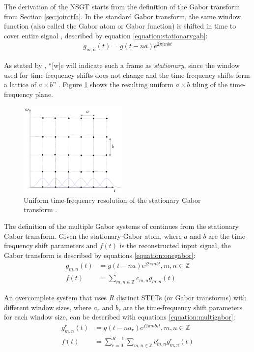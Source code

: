 \documentclass[report.tex]{subfiles}
\begin{document}
The derivation of the NSGT starts from the definition of the Gabor transform from Section \ref{sec:jointtfa}. In the standard Gabor transform, the same window function (also called the Gabor atom or Gabor function) is shifted in time to cover entire signal \parencite{adaptivecqt}, described by equation \eqref{equation:stationarygab}:
\begin{align} \tag{11}\label{equation:stationarygab}
g_{m, n}(t) = g(t - na)e^{2\pi i m b t}
\end{align}

As stated by \citeauthor{adaptivecqt}, ``[w]e will indicate such a frame as \textit{stationary}, since the window used for time-frequency shifts does not change and the time-frequency shifts form a lattice of $a \times b$'' \parencite[3]{adaptivecqt}. Figure \ref{fig:uniformtflattice} shows the resulting uniform $a \times b$ tiling of the time-frequency plane.

\begin{figure}[ht]
	\centering
	\includegraphics[width=0.4688\textwidth]{./images-tftheory/stationarygabor.png}
	\caption{Uniform time-frequency resolution of the stationary Gabor transform \parencite[3]{adaptivecqt}.}
	\label{fig:uniformtflattice}
\end{figure}

The definition of the multiple Gabor systems of \textcite{doerflerphd} continues from the stationary Gabor transform. Given the stationary Gabor atom, where $a$ and $b$ are the time-frequency shift parameters and $f(t)$ is the reconstructed input signal, the Gabor transform is described by equations \eqref{equation:onegabor}:
\begin{align}
	\nonumber g_{m,n}(t) &= g(t - na)e^{j2\pi m b t}, m,n \in \mathbb{Z}\\
	\nonumber f(t) &= \sum_{m,n \in \mathbb{Z}}c_{m,n}g_{m,n}(t) \tag{12}\label{equation:onegabor}
\end{align}

An overcomplete system that uses $R$ distinct STFTs (or Gabor transforms) with different window sizes, where $a_{r}$ and $b_{r}$ are the time-frequency shift parameters for each window size, can be described with equations \eqref{equation:multigabor}:
\begin{align}
	\nonumber g_{m,n}^{r}(t) &= g(t - na_{r})e^{j2\pi m b_{r} t}, m,n \in \mathbb{Z}\\
	\nonumber f(t) &= \sum_{r=0}^{R-1}\sum_{m,n \in \mathbb{Z}}c^{r}_{m,n}g^{r}_{m,n}(t) \tag{13}\label{equation:multigabor}
\end{align}
\end{document}
